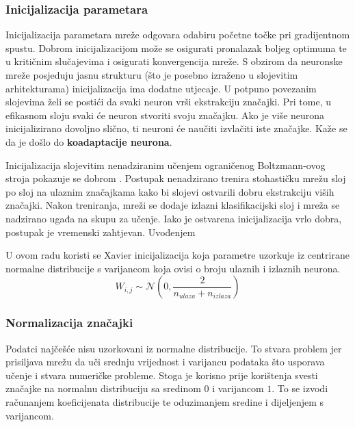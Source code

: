 \documentclass[times, utf8, numeric, diplomski]{fer}
\def\normal{\mathcal{N}}
\def\TODO#1{\noindent\textcolor{red}{TODO: \textit{#1}}\newline}
\def\todo#1{\TODO{#1}}
\begin{document}
\subsubsection{Inicijalizacija parametara}
Inicijalizacija parametara mreže odgovara odabiru početne točke pri gradijentnom spustu. Dobrom inicijalizacijom može se osigurati pronalazak boljeg optimuma te u kritičnim slučajevima i osigurati konvergencija mreže. S obzirom da neuronske mreže posjeduju jasnu strukturu (što je posebno izraženo u slojevitim arhitekturama) inicijalizacija ima dodatne utjecaje. U potpuno povezanim slojevima želi se postići da svaki neuron vrši ekstrakciju značajki. Pri tome, u efikasnom sloju svaki će neuron stvoriti svoju značajku. Ako je više neurona inicijalizirano dovoljno slično, ti neuroni će naučiti izvlačiti iste značajke. Kaže se da je došlo do \textbf{koadaptacije neurona}.

Inicijalizacija slojevitim nenadziranim učenjem ograničenog Boltzmann-ovog stroja  pokazuje se dobrom \citep{relu6}. Postupak nenadzirano trenira stohastičku mrežu sloj po sloj na ulaznim značajkama kako bi slojevi ostvarili dobru ekstrakciju viših značajki. Nakon treniranja, mreži se dodaje izlazni klasifikacijski sloj i mreža se nadzirano ugađa na skupu za učenje. Iako je ostvarena inicijalizacija vrlo dobra, postupak je vremenski zahtjevan. Uvođenjem 


U ovom radu koristi se Xavier inicijalizacija koja parametre uzorkuje iz centrirane normalne distribucije s varijancom koja ovisi o broju ulaznih i izlaznih neurona. \citep{xavier}
\begin{equation}
W_{i,j} \sim \normal(0, \frac{2}{n_{ulaza}+n_{izlaza}})
\end{equation}

\subsubsection{Normalizacija značajki}
Podatci najčešće nisu uzorkovani iz normalne distribucije. To stvara problem jer prisiljava mrežu da uči srednju vrijednost i varijancu podataka što usporava učenje i stvara numeričke probleme. Stoga je korisno prije korištenja svesti značajke na normalnu distribuciju sa sredinom $0$ i varijancom $1$. To se izvodi računanjem koeficijenata distribucije te oduzimanjem sredine i dijeljenjem s varijancom.
\end{document}
